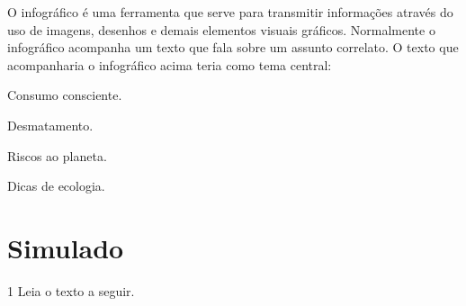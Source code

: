 \noindent O infográfico é uma ferramenta que serve para transmitir informações
através do uso de imagens, desenhos e demais elementos visuais gráficos.
Normalmente o infográfico acompanha um texto que fala sobre um assunto
correlato. O texto que acompanharia o infográfico acima teria como tema
central:

\begin{escolha}
\item Consumo consciente.
\item Desmatamento.
\item Riscos ao planeta.
\item Dicas de ecologia.
\end{escolha}



\chapter[Simulado 2]{Simulado}

\num{1} Leia o texto a seguir.

